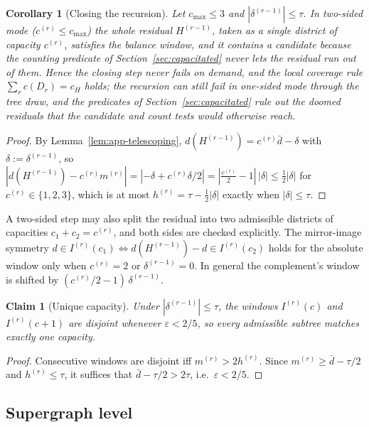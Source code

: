 \documentclass[11pt]{article}
\newtheorem{corollary}[theorem]{Corollary}
\newtheorem{claim}[theorem]{Claim}
\theoremstyle{definition}
\begin{document}
\begin{corollary}[Closing the recursion]\label{cor:app-closing}\label{thm:feasibility}\label{thm:feas}
Let $c_{\max}\le 3$ and $|\delta^{(r-1)}|\le\tau$. In two-sided mode ($c^{(r)}\le c_{\max}$) the whole residual $H^{(r-1)}$, taken as a single district of capacity $c^{(r)}$, satisfies the balance window, and it contains a candidate because the counting predicate of Section~\ref{sec:capacitated} never lets the residual run out of them. Hence the closing step never fails on demand, and the local coverage rule $\sum_r c(D_r)=c_H$ holds; the recursion can still fail in one-sided mode through the tree draw, and the predicates of Section~\ref{sec:capacitated} rule out the doomed residuals that the candidate and count tests would otherwise reach.
\end{corollary}
\begin{proof}
By Lemma~\ref{lem:app-telescoping}, $d(H^{(r-1)})=c^{(r)}\bar d-\delta$
with $\delta:=\delta^{(r-1)}$, so
$|d(H^{(r-1)})-c^{(r)}m^{(r)}|=|{-\delta}+c^{(r)}\delta/2|
 =|\tfrac{c^{(r)}}{2}-1|\,|\delta|\le\tfrac12|\delta|$ for
$c^{(r)}\in\{1,2,3\}$, which is at most $h^{(r)}=\tau-\tfrac12|\delta|$
exactly when $|\delta|\le\tau$.
\end{proof}

A two-sided step may also split the residual into two admissible districts
of capacities $c_1+c_2=c^{(r)}$, and both sides are checked explicitly. The mirror-image symmetry $d\in I^{(r)}(c_1)\Leftrightarrow d(H^{(r-1)})-d\in I^{(r)}(c_2)$ holds for the absolute window only when $c^{(r)}=2$ or $\delta^{(r-1)}=0$. In general the complement's window is shifted by $(c^{(r)}/2-1)\,\delta^{(r-1)}$.

\begin{claim}[Unique capacity]\label{claim:app-unique}\label{claim:unique-capacity}\label{claim:disjoint}
Under $|\delta^{(r-1)}|\le\tau$, the windows $I^{(r)}(c)$ and
$I^{(r)}(c+1)$ are disjoint whenever $\varepsilon<2/5$, so every admissible subtree matches exactly one capacity.
\end{claim}
\begin{proof}
Consecutive windows are disjoint iff $m^{(r)}>2h^{(r)}$. Since
$m^{(r)}\ge\bar d-\tau/2$ and $h^{(r)}\le\tau$, it suffices that
$\bar d-\tau/2>2\tau$, i.e.\ $\varepsilon<2/5$.
\end{proof}

\subsection*{Supergraph level}
\label{app:supergraph-correctness}\label{sec:supergraph}
\end{document}
